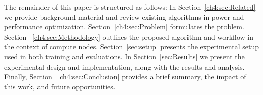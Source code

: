 The remainder of this paper is structured as follows: 
In Section~\ref{ch4:sec:Related} we provide background material and review existing algorithms in power and performance optimization. 
Section~\ref{ch4:sec:Problem} formulates the problem. 
Section ~\ref{ch4:sec:Methodology} outlines the proposed algorithm and workflow in the context of compute nodes. Section~\ref{sec:setup} presents the experimental setup used in both training and evaluations. 
In Section~\ref{sec:Results} we present the experimental design and implementation, along with the results and analysis. 
Finally, Section ~\ref{ch4:sec:Conclusion} provides  a brief summary, the impact of this work, and future opportunities. 